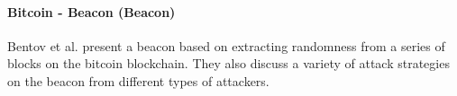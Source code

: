 \paragraph{Bitcoin - Beacon (\pi Beacon) } 
\citet{bentov2016bitcoin} Bentov et al. \cite{bentov2016bitcoin} present a beacon based on extracting randomness from a series of blocks on the bitcoin blockchain. They also discuss a variety of attack strategies on the beacon from different types of attackers.  
